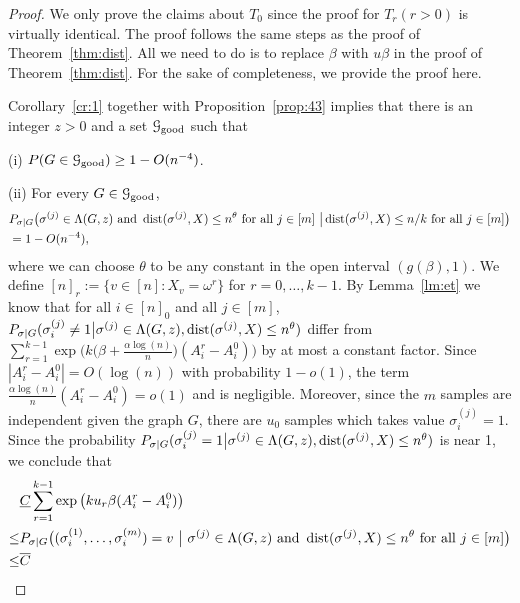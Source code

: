 \documentclass{article}
\begin{document}
\begin{proof}

	We only prove the claims about $T_0$ since the proof for $T_r (r>0)$ is virtually identical.
	The proof follows the same steps as the proof of Theorem~\ref{thm:dist}. All we need to do is to replace $\beta$ with $u\beta$ in the proof of Theorem~\ref{thm:dist}. For the sake of completeness, we provide the proof here.
	
	
	Corollary~\ref{cr:1} together with Proposition~\ref{prop:43} implies that there is an integer $z>0$ and a set $\mathcal{G}_{\operatorname{good}}$ such that
	
	\noindent (i)
	$P(G\in\mathcal{G}_{\operatorname{good}}) \ge 1- O(n^{-4})$.
	
	\noindent (ii) For every $G\in\mathcal{G}_{\operatorname{good}}$, 
	\begin{equation}  \label{eq:ljrc}
	\begin{aligned}
	& P_{\sigma|G} \big( \sigma^{(j)}\in  \Lambda(G, z)
	\text{~and~} \operatorname{dist}(\sigma^{(j)}, X) \le n^\theta
	\text{~for all~} j\in[m] ~\big| \operatorname{dist}(\sigma^{(j)}, X) \le n/k
	\text{~for all~} j\in[m]  \big) \\
	& =1- O(n^{-4}) ,
	\end{aligned}
	\end{equation}
	where we can choose $\theta$ to be any constant in the open interval $(g(\beta), 1)$.
	We define $[n]_r:=\{v\in[n]:X_v= \omega^r\}$ for $r=0, \dots, k-1$.
	By Lemma~\ref{lm:et} we know that for all $i\in[n]_0$ and all $j\in[m]$,
	$P_{\sigma|G}(\sigma_i^{(j)} \neq 1 \big| \sigma^{(j)}\in \Lambda(G,z) ,\operatorname{dist}(\sigma^{(j)}, X) \le n^{\theta} )$ differ from
	$\sum_{r=1}^{k-1}\exp\Big(k\big(\beta+\frac{\alpha\log(n)}{n} \big) (A^r_i-A^0_i) \Big)$
	by at most a constant factor. Since $|A^r_i-A^0_i|=O(\log(n))$ with probability $1-o(1)$, the term $\frac{\alpha\log(n)}{n}(A^r_i-A^0_i)=o(1)$ and is negligible. Moreover, since the $m$ samples are independent given the graph $G$, there are $u_0$ samples which takes value $\sigma_i^{(j)} = 1$. Since the probability
	$P_{\sigma|G}(\sigma_i^{(j)} = 1 \big| \sigma^{(j)}\in \Lambda(G,z) ,\operatorname{dist}(\sigma^{(j)}, X) \le n^{\theta} )$ is near 1, we conclude that
	\begin{align*}
	& \underline{C}
	\sum_{r=1}^{k-1}\exp\big(k u_r \beta (A^r_i-A^0_i) \big) \\
	\le
	& P_{\sigma|G} \big( (\sigma_i^{(1)},\dots,\sigma_i^{(m)})=v ~\big|~ \sigma^{(j)}\in  \Lambda(G, z)
	\text{~and~} \dist(\sigma^{(j)}, X) \le n^\theta
	\text{~for all~} j\in[m] \big) \\
	\le & \overline{C}

\end{align*}
\end{proof}
\end{document}
